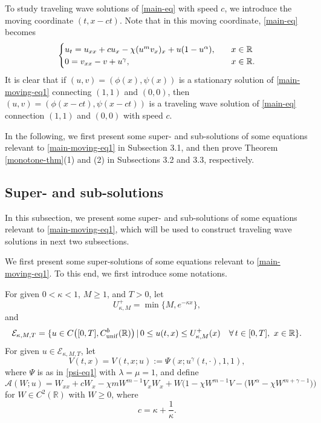 \documentclass[11pt]{article} %
\theoremstyle{remark}
\theoremstyle{remark}
\numberwithin{equation}{section}
\numberwithin{figure}{section}
\numberwithin{table}{section}
\newcommand\RR{\ensuremath{\mathbb{R}}}
\begin{document}
To study traveling wave solutions of \eqref{main-eq} with speed $c$, we introduce the moving coordinate
$(t,x-ct)$. Note that in this moving coordinate, \eqref{main-eq} becomes
\begin{equation}
\label{main-moving-eq1}
\begin{cases}
u_t=u_{xx}+cu_x-\chi(u^m v_x)_x +u(1-u^\alpha),\quad &x\in\RR\cr
0=v_{xx}-v+u^\gamma,\quad&x\in\RR.
\end{cases}
\end{equation}
It is clear that if $(u,v)=(\phi(x),\psi(x))$ is a stationary solution of \eqref{main-moving-eq1} connecting $(1,1)$ and $(0,0)$, then
$(u,v)=(\phi(x-ct),\psi(x-ct))$ is a traveling wave solution of \eqref{main-eq} connection $(1,1)$ and $(0,0)$ with speed $c$.


 In the following, we first present some super- and sub-solutions  of  some equations relevant to \eqref{main-moving-eq1} in Subsection 3.1, and then prove Theorem \ref{monotone-thm}(1) and (2) in Subsections
3.2 and 3.3, respectively. 


\subsection{Super- and sub-solutions}

In this subsection, we present  some  super- and sub-solutions of  some equations relevant to \eqref{main-moving-eq1},  which will be used to construct traveling wave solutions in next two subsections.  


We first present some  super-solutions of  some equations relevant to \eqref{main-moving-eq1}. To this end, we first introduce
 some notations.


For given  $0<\kappa<1$, $M\ge 1$, and $T>0$, let
$$
U_{\kappa, M}^+=\min\{M,e^{-\kappa x}\},
$$
and
$$
\mathcal{E}_{\kappa,M,T}=\{u\in C\big([0,T], C_{\rm unif}^b(\RR)\big)\,|\, 0\le u(t,x)\le U_{\kappa,M}^+(x)\quad \forall\, t\in [0,T],\,\, x\in\RR\}.
$$
For given  $u\in\mathcal{E}_{\kappa,M,T}$, let 
$$V(t,x)=V(t,x;u):=\Psi(x; u^\gamma(t,\cdot), 1,1),
$$
where $\Psi$ is as in \eqref{psi-eq1} with $\lambda=\mu=1$,
and define
$$
\mathcal{A}(W;u)=W_{xx}+cW_x-\chi m W^{m-1}  V_x W_x + W\Big(1-\chi W^{m-1} V -\big(W^\alpha -\chi  W^{m+\gamma-1}\big)\Big)
$$
for $W\in C^2(\RR)$ with $W\ge 0$, where
$$
c=\kappa+\frac{1}{\kappa}.
$$






\end{document}
